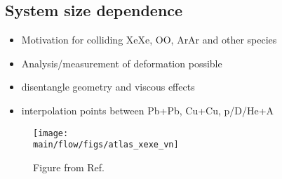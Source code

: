 \subsection{System size dependence}
\label{sec:flow_sizedep}
\begin{itemize}
\item Motivation for colliding XeXe,  OO,  ArAr and other species
\item Analysis/measurement of deformation possible
\item disentangle geometry and viscous effects
\item interpolation points between Pb+Pb,  Cu+Cu,  p/D/He+A
\end{itemize}


\begin{figure}[!htb]
\begin{center}
\texttt{[image: \\main/flow/figs/atlas\_xexe\_vn]}
\caption{
	Figure from Ref.~\cite{ATLAS-CONF-2018-011}
}
\label{fig:atlas_xexe_vn}
\end{center}
\end{figure}
